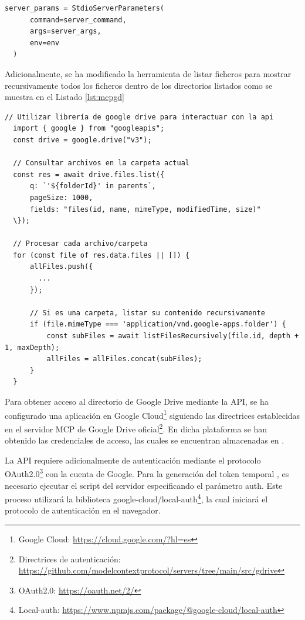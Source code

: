 \begin{itemize}
\begin{lstlisting}[caption={\protect\opus{mcp_multi_client.py}: StdioServerParameters para el servidor MCP de Google Drive},label={lst:clientgd}]
  server_params = StdioServerParameters(
      command=server_command,
      args=server_args,
      env=env
  )
\end{lstlisting}


Adicionalmente, se ha modificado la herramienta de listar ficheros para mostrar recursivamente todos los ficheros dentro de los directorios listados como se muestra en el Listado \ref{lst:mcpgd}


\begin{lstlisting}[caption={\protect\opus{index_mod.js}: herramienta \protect\opus{gdrive_list_files} utilizando la API de Google Drive},label={lst:mcpgd}]
  // Utilizar librería de google drive para interactuar con la api
  import { google } from "googleapis";
  const drive = google.drive("v3"); 

  // Consultar archivos en la carpeta actual
  const res = await drive.files.list({
      q: `'${folderId}' in parents`,
      pageSize: 1000,
      fields: "files(id, name, mimeType, modifiedTime, size)"
  \});

  // Procesar cada archivo/carpeta
  for (const file of res.data.files || []) {
      allFiles.push({
        ...
      });
      
      // Si es una carpeta, listar su contenido recursivamente
      if (file.mimeType === 'application/vnd.google-apps.folder') {
          const subFiles = await listFilesRecursively(file.id, depth + 1, maxDepth);
          allFiles = allFiles.concat(subFiles);
      }
  }
\end{lstlisting}
Para obtener acceso al directorio de Google Drive mediante la API, se ha configurado una aplicación en Google Cloud\footnote{Google Cloud: \url{https://cloud.google.com/?hl=es}} siguiendo las directrices establecidas en el servidor MCP de Google Drive oficial\footnote{Directrices de autenticación: \url{https://github.com/modelcontextprotocol/servers/tree/main/src/gdrive}}. En dicha plataforma se han obtenido las credenciales de acceso, las cuales se encuentran almacenadas en .

La API requiere adicionalmente de autenticación mediante el protocolo OAuth2.0\footnote{OAuth2.0: \url{https://oauth.net/2/}} con la cuenta de Google. Para la generación del token temporal , es necesario ejecutar el script del servidor especificando el parámetro auth. Este proceso utilizará la biblioteca google-cloud/local-auth\footnote{Local-auth: \url{https://www.npmjs.com/package/@google-cloud/local-auth}}, la cual iniciará el protocolo de autenticación en el navegador.

\end{itemize}

